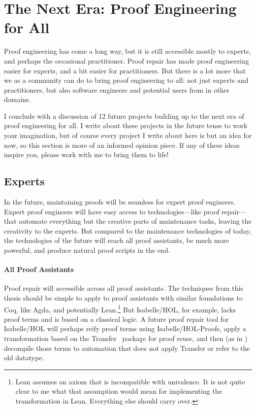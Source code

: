 \section*{The Next Era: Proof Engineering for All}


Proof engineering has come a long way, but it is still accessible mostly to experts, and perhaps the occasional practitioner.
Proof repair has made proof engineering easier for experts, and a bit easier for practitioners.
But there is a lot more that we as a community can do to bring proof engineering to all: not just experts and practitioners,
but also software engineers and potential users from in other domains.

I conclude with a discussion of 12 future projects building up to the next era of proof engineering for all.
I write about these projects in the future tense to work your imagination, but of course every project I write about here is but an idea for now,
so this section is more of an informed opinion piece.
If any of these ideas inspire you, please work with me to bring them to life!

\subsection*{Experts}

In the future, maintaining proofs will be seamless for expert proof engineers.
Expert proof engineers will have easy access to technologies---like proof repair---that automate everything but the creative parts of maintenance tasks,
leaving the creativity to the experts.
But compared to the maintenance technologies of today, the technologies of the future will reach all proof assistants,
be much more powerful,
and produce natural proof scripts in the end.

\paragraph{All Proof Assistants}
Proof repair will accessible across all proof assistants.
The techniques from this thesis should be simple to apply to proof assistants with similar foundations to Coq, like Agda,
and potentially Lean.\footnote{Lean assumes an axiom that is incompatible with univalence.
It is not quite clear to me what that assumption would mean for implementing the \toolnamec transformation in Lean.
Everything else should carry over.}
But Isabelle/HOL, for example, lacks proof terms and is based on a classical logic.
A future proof repair tool for Isabelle/HOL will perhaps reify proof terms using
Isabelle/HOL-Proofs, apply a transformation based on the Transfer~\cite{Huffman2013} package for proof reuse, and then (as in \toolnamec) decompile those terms to automation that does 
not apply Transfer or refer to the old datatype.


